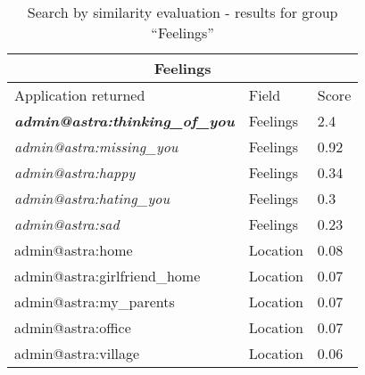 \begin{table}[h!]
	\tiny
    \begin{center}
		\begin{tabular}{||l|l|l||}

		\hline \hline
		\multicolumn{3}{||c||}{\bfseries{Feelings}} \\
		\hline \hline
			Application returned & Field & Score \\
			\hline \hline
			
			\textit{\textbf{admin@astra:thinking\_of\_you}}	&	Feelings	&	2.4	\\
			\hline
			\textit{admin@astra:missing\_you}	&	Feelings	&	0.92	\\
			\hline
			\textit{admin@astra:happy}	&	Feelings	&	0.34	\\
			\hline
			\textit{admin@astra:hating\_you}	&	Feelings	&	0.3	\\
			\hline
			\textit{admin@astra:sad}	&	Feelings	&	0.23	\\
			\hline
			admin@astra:home	&	Location	&	0.08	\\
			\hline
			admin@astra:girlfriend\_home	&	Location	&	0.07	\\
			\hline
			admin@astra:my\_parents	&	Location	&	0.07	\\
			\hline
			admin@astra:office	&	Location	&	0.07	\\
			\hline
			admin@astra:village	&	Location	&	0.06	\\


		\hline \hline

		\end{tabular}
		\caption{\label{table:testing-results-feelings}Search by similarity evaluation
		- results for group ``Feelings''}
	\end{center}
\end{table} 

